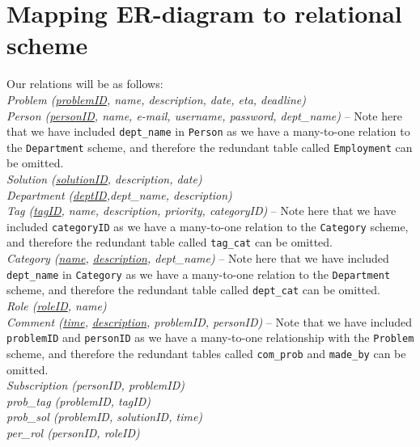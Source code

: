 \section{Mapping ER-diagram to relational scheme}
\label{sec:map_er_rel}

Our relations will be as follows:\\

\noindent\textit{Problem (\underline{problemID}, name, description, date, eta, deadline)} \\

\noindent\textit{Person (\underline{personID}, name, e-mail, username, password, dept\_name)}  -- Note here that we have included \verb+dept_name+ in \verb+Person+ as we have a many-to-one relation to the \verb+Department+ scheme, and therefore the redundant table called \verb+Employment+ can be omitted.\\

\noindent\textit{Solution (\underline{solutionID}, description, date)} \\

\noindent\textit{Department (\underline{deptID},dept\_name, description)} \\

\noindent\textit{Tag (\underline{tagID}, name, description, priority, categoryID)} -- Note here that we have included \verb+categoryID+ as we have a many-to-one relation to the \verb+Category+ scheme, and therefore the redundant table called \verb+tag_cat+ can be omitted.\\

\noindent\textit{Category (\underline{name}, \underline{description}, dept\_name)} -- Note here that we have included \verb+dept_name+ in \verb+Category+ as we have a many-to-one relation to the \verb+Department+ scheme, and therefore the redundant table called \verb+dept_cat+ can be omitted.\\

\noindent\textit{Role (\underline{roleID}, name)} \\

\noindent\textit{Comment (\underline{time}, \underline{description}, problemID, personID)} -- Note that we have included \verb+problemID+ and \verb+personID+ as we have a many-to-one relationship with the \verb+Problem+ scheme, and therefore the redundant tables called \verb+com_prob+ and \verb+made_by+ can be omitted.\\


\noindent\textit{Subscription (personID, problemID)} \\

\noindent\textit{prob\_tag (problemID, tagID)} \\

\noindent\textit{prob\_sol (problemID, solutionID, time)} \\

\noindent\textit{per\_rol (personID, roleID)} \\